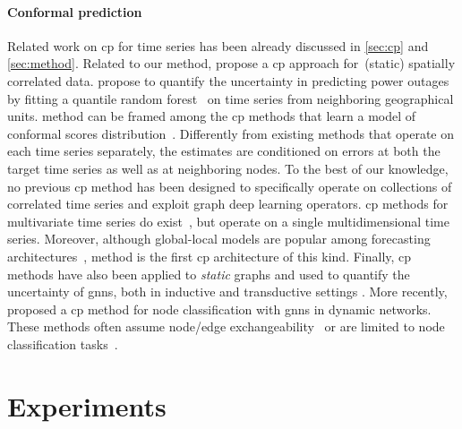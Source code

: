 \paragraph{Conformal prediction} Related work on \gls{cp} for time series  has been already discussed in \autoref{sec:cp} and \autoref{sec:method}. Related to our method, \citet{mao2024valid} propose a \gls{cp} approach for~(static) spatially correlated data. \citet{jiang2024spatio} propose to quantify the uncertainty in predicting power outages by fitting a quantile random forest~\cite{meinshausen2006quantile} on time series from neighboring geographical units.
\gls{method} can be framed among the \gls{cp} methods that learn a model of conformal scores distribution~\citep{xu2023sequential, lee2024conformal}. Differently from existing methods that operate on each time series separately, the estimates are conditioned on errors at both the target time series as well as at neighboring nodes.
To the best of our knowledge, no previous \gls{cp} method has been designed to specifically operate on collections of correlated time series and exploit graph deep learning operators. \gls{cp} methods for multivariate time series do exist~\cite{xu2024conformal, sun2024copula}, but operate on a single multidimensional time series. Moreover, although global-local models are popular among forecasting architectures~\cite{smyl2020hybrid, benidis2022deep}, \gls{method} is the first \gls{cp} architecture of this kind. Finally, \gls{cp} methods have also been applied to \textit{static} graphs and used to quantify the uncertainty of \glspl{gnn}, both in inductive \cite{zargarbashi2023conformal} and transductive settings \cite{huang2024uncertainty}. More recently, \citet{davis2024valid} proposed a \gls{cp} method for node classification with \glspl{gnn} in dynamic networks. These methods often assume node/edge exchangeability~\cite{zargarbashi2023conformal, huang2024uncertainty} or are limited to node classification tasks~\cite{clarkson2023distribution}. 




\section{Experiments}\label{sec:experiments}



